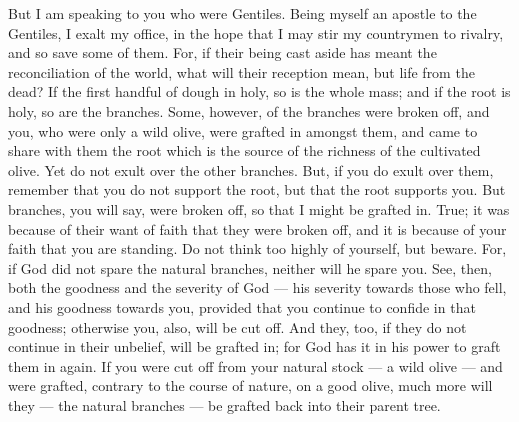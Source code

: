  But I am speaking to you who were Gentiles. 
Being myself an apostle to the Gentiles, I exalt my office, in the hope
that I may stir my countrymen to rivalry, and so save some of them.
 For, if their being cast aside has meant the
reconciliation of the world, what will their reception mean, but life
from the dead?  If the first handful of dough in holy, so
is the whole mass; and if the root is holy, so are the branches.
 Some, however, of the branches were broken off, and you,
who were only a wild olive, were grafted in amongst them, and came to
share with them the root which is the source of the richness of the
cultivated olive.  Yet do not exult over the other
branches. But, if you do exult over them, remember that you do not
support the root, but that the root supports you.  But
branches, you will say, were broken off, so that I might be grafted in.
 True; it was because of their want of faith that they were
broken off, and it is because of your faith that you are standing. Do
not think too highly of yourself, but beware.  For, if God
did not spare the natural branches, neither will he spare you.
 See, then, both the goodness and the severity of God ---
his severity towards those who fell, and his goodness towards you,
provided that you continue to confide in that goodness; otherwise you,
also, will be cut off.  And they, too, if they do not
continue in their unbelief, will be grafted in; for God has it in his
power to graft them in again.  If you were cut off from
your natural stock --- a wild olive --- and were grafted, contrary to
the course of nature, on a good olive, much more will they --- the
natural branches --- be grafted back into their parent tree.

